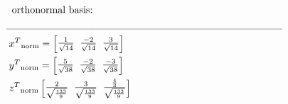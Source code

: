 \documentclass{article}
\begin{document}
\begin{align*}
    &\hspace{2mm}\text{orthonormal basis: } \\
    &\_\_\_\_\_\_\_\_\_\_\_\_\_\_\_\_\_\_\_\_\_\_\_\_\_\_\_\_\_\_\_\_\_\_\_\_\_ \\ 
    &\hspace{1mm}x^{T}\textsubscript{norm} = 
    \begin{bmatrix}
        \frac{1}{\sqrt{14}} \hspace{2mm} \frac{-2}{\sqrt{14}} \hspace{2mm} \frac{3}{\sqrt{14}}
    \end{bmatrix} \\ 
    &\hspace{1mm}y^{T}\textsubscript{norm} = 
    \begin{bmatrix}
        \frac{5}{\sqrt{38}} \hspace{2mm} \frac{-2}{\sqrt{38}} \hspace{2mm} \frac{-3}{\sqrt{38}}
    \end{bmatrix} \\ 
    &\hspace{1mm}z^{T}\textsubscript{norm}
    \begin{bmatrix}
        \frac{2}{\sqrt{\frac{133}{9}}} \hspace{2mm} \frac{3}{\sqrt{\frac{133}{9}}} \hspace{2mm} \frac{\frac{4}{3}}{\sqrt{\frac{133}{9}}}
    \end{bmatrix} \\ 
\end{align*}
\end{document}
